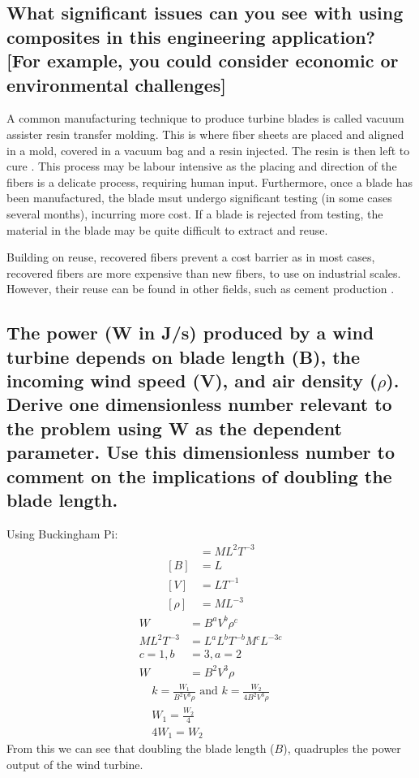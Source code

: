 \documentclass[12pt]{article}
\numberwithin{equation}{section}
\begin{document}
\begin{flushleft}
\subsection{What significant issues can you see with using composites in this engineering application? [For 
example, you could consider economic or environmental
challenges]}
A common manufacturing technique to produce turbine blades is called vacuum assister resin transfer molding. This is where fiber sheets are placed and aligned in a mold, covered in a vacuum bag and a resin injected. The resin is then left to cure \citep{VARTM}. This process may be labour intensive as the placing and direction of the fibers is a delicate process, requiring human input. Furthermore, once a blade has been manufactured, the blade msut undergo significant testing (in some cases several months), incurring more cost. If a blade is rejected from testing, the material in the blade may be quite difficult to extract and reuse. 

Building on reuse, recovered fibers prevent a cost barrier as in most cases, recovered fibers are more expensive than new fibers, to use on industrial scales. However, their reuse can be found in other fields, such as cement production \citep{fiberCement}.

\subsection{The power (W in J/s) produced by a wind turbine depends on blade length (B), the incoming wind speed (V), and air density (\(\rho\)). Derive one dimensionless number relevant to the problem using W as the dependent parameter. Use this dimensionless number to comment on the implications of doubling the blade length.}
Using Buckingham Pi:
\begin{align}
  [W] &= ML^2T^{-3}\\
  [B] &= L\\
  [V] &= LT^{-1}\\
  [\rho] &= ML^{-3}
\end{align}
\begin{align}
  W &= B^a V^b \rho^c\\
  ML^2T^{-3} &= L^a L^b T^{-b} M^c L^{-3c}\\
  c = 1, b &= 3, a = 2\\
  W &= B^2 V^3 \rho
\end{align}
\begin{gather}
  k = \frac{W_1}{B^2 V^3 \rho} \textrm{ and } k = \frac{W_2}{4B^2 V^3 \rho}\\
  W_1 = \frac{W_2}{4} \\
  4W_1 = W_2
\end{gather}
From this we can see that doubling the blade length (\(B\)), quadruples the power output of the wind turbine.


\end{flushleft}
\end{document}
